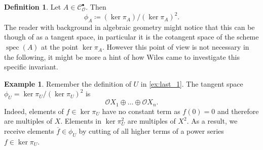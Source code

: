 \documentclass{article}
\theoremstyle{plain}%
\theoremstyle{definition}
\newtheorem{definition}{Definition}[section]
\newtheorem{example}{Example}[section]
\theoremstyle{remark}
\newcommand{\cob}{\mathcal{C}_\mathcal{O}^\bullet}
\begin{document}
\begin{definition}
    Let \(A \in \cob\). Then
    \[\phi_A \coloneqq (\ker \pi_A)/(\ker \pi_A)^2.\]
    The reader with background in algebraic geometry might notice that this can be though of as a tangent space, 
    in particular it is the cotangent space of the scheme \(\operatorname{spec}(A)\) at the point \(\ker \pi_A\).
    However this point of view is not necessary in the following, 
    it might be more a hint of how Wiles came to investigate this specific invariant.
\end{definition}

\begin{example}\label{ex:last_phi}
    Remember the definition of \(U\) in \cref{ex:last_1}.
    The tangent space \(\phi_U = \ker \pi_U/(\ker \pi_U)^2\) is
    \[
        \mathcal{O}X_1 \oplus \dots \oplus \mathcal{O}X_n.
    \]
    Indeed, elements of \(f \in \ker \pi_U\) have no constant term as \(f(0) = 0\) and therefore are multiples of \(X\).
    Elements in \(\ker \pi_U^2\) are multiples of \(X^2\). As a result, we receive elements \(\overline{f} \in \phi_U\) by
    cutting of all higher terms of a power series \(f \in \ker \pi_U\).
\end{example}
\end{document}
